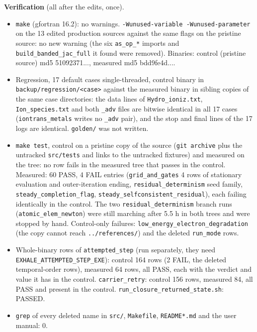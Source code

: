 \documentclass[english,a4paper]{my_memo}
\providecommand{\tightlist}{\setlength{\itemsep}{0pt}\setlength{\parskip}{0pt}}
\begin{document}
\textbf{Verification} (all after the edits, once).

\begin{itemize}
\tightlist
\item
  \texttt{make} (gfortran 16.2): no warnings. \texttt{-Wunused-variable\ -Wunused-parameter} on the 13 edited production sources against the same flags on the pristine source: no new warning (the six \texttt{as\_op\_*} imports and \texttt{build\_banded\_jac\_full} it found were removed). Binaries: control (pristine source) md5 51092371..., measured md5 bdd9fe4d....
\item
  Regression, 17 default cases single-threaded, control binary in \texttt{backup/regression/\textless{}case\textgreater{}} against the measured binary in sibling copies of the same case directories: the data lines of \texttt{Hydro\_ioniz.txt}, \texttt{Ion\_species.txt} and both \texttt{\_adv} files are bitwise identical in all 17 cases (\texttt{iontrans\_metals} writes no \texttt{\_adv} pair), and the stop and final lines of the 17 logs are identical. \texttt{golden/} was not written.
\item
  \texttt{make\ test}, control on a pristine copy of the source (\texttt{git\ archive} plus the untracked \texttt{src/tests} and links to the untracked fixtures) and measured on the tree: no row fails in the measured tree that passes in the control. Measured: 60 PASS, 4 FAIL entries (\texttt{grid\_and\_gates} 4 rows of stationary evaluation and outer-iteration ending, \texttt{residual\_determinism} seed family, \texttt{steady\_completion\_flag}, \texttt{steady\_selfconsistent\_residual}), each failing identically in the control. The two \texttt{residual\_determinism} branch runs (\texttt{atomic\_elem\_newton}) were still marching after 5.5 h in both trees and were stopped by hand. Control-only failures: \texttt{low\_energy\_electron\_degradation} (the copy cannot reach \texttt{../references/}) and the deleted \texttt{run\_mode} rows.
\item
  Whole-binary rows of \texttt{attempted\_step} (run separately, they need \texttt{EXHALE\_ATTEMPTED\_STEP\_EXE}): control 164 rows (2 FAIL, the deleted temporal-order rows), measured 64 rows, all PASS, each with the verdict and value it has in the control. \texttt{carrier\_retry}: control 156 rows, measured 84, all PASS and present in the control. \texttt{run\_closure\_returned\_state.sh}: PASSED.
\item
  \texttt{grep} of every deleted name in \texttt{src/}, \texttt{Makefile}, \texttt{README*.md} and the user manual: 0.
\end{itemize}
\end{document}
